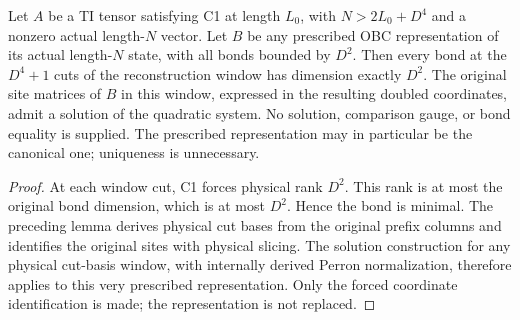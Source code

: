 \begin{lemma}
    \label{lem:quadratic_prescribed_obc_window_solution}
    \leanok
    Let $A$ be a TI tensor satisfying C1 at length $L_0$, with
    $N>2L_0+D^4$ and a nonzero actual length-$N$ vector. Let $B$ be any
    prescribed OBC representation of its actual length-$N$ state,
    with all bonds bounded by $D^2$. Then every bond at the
    $D^4+1$ cuts of the reconstruction window has dimension exactly
    $D^2$. The original site matrices of $B$ in this window, expressed
    in the resulting doubled coordinates, admit a solution of the
    quadratic system. No solution, comparison gauge, or bond equality
    is supplied. The prescribed representation may in particular
    be the canonical one; uniqueness is unnecessary.
\end{lemma}
\begin{proof}
    \leanok
    At each window cut, C1 forces physical rank $D^2$. This rank is
    at most the original bond dimension, which is at most $D^2$.
    Hence the bond is minimal. The preceding lemma derives physical
    cut bases from the original prefix columns and identifies the
    original sites with physical slicing. The solution construction
    for any physical cut-basis window, with internally derived
    Perron normalization, therefore applies to this very
    prescribed representation. Only the forced coordinate
    identification is made; the representation is not replaced.
\end{proof}

